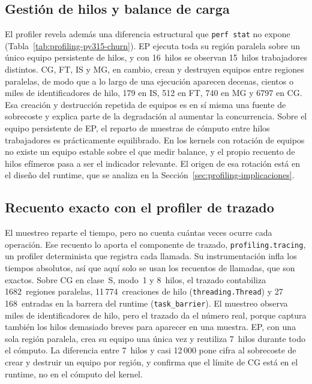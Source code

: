 

\subsection{Gestión de hilos y balance de carga}
El profiler revela además una diferencia estructural que \texttt{perf stat} no
expone (Tabla~\ref{tab:profiling-py315-churn}). EP ejecuta toda su región
paralela sobre un único equipo persistente de hilos, y con 16~hilos se observan
15~hilos trabajadores distintos. CG, FT, IS y MG, en cambio, crean y destruyen
equipos entre regiones paralelas, de modo que a lo largo de una ejecución
aparecen decenas, cientos o miles de identificadores de hilo, 179 en IS, 512 en
FT, 740 en MG y 6797 en CG. Esa creación y destrucción repetida de equipos es en
sí misma una fuente de sobrecoste y explica parte de la degradación al aumentar
la concurrencia. Sobre el equipo persistente de EP, el reparto de muestras de
cómputo entre hilos trabajadores es prácticamente equilibrado. En los kernels con
rotación de equipos no existe un equipo estable sobre el que medir balance, y el
propio recuento de hilos efímeros pasa a ser el indicador relevante. El origen de
esa rotación está en el diseño del runtime, que se analiza en la
Sección~\ref{sec:profiling-implicaciones}.



\newpage
\subsection{Recuento exacto con el profiler de trazado}
El muestreo reparte el tiempo, pero no cuenta cuántas veces ocurre cada
operación. Ese recuento lo aporta el componente de trazado,
\texttt{profiling.tracing}, un profiler determinista que registra cada llamada.
Su instrumentación infla los tiempos absolutos, así que aquí solo se usan los
recuentos de llamadas, que son exactos. Sobre CG en clase~S, modo~1 y 8~hilos, el
trazado contabiliza 1682~regiones paralelas, 11\,774~creaciones de hilo
(\texttt{threading.Thread}) y 27\,168~entradas en la barrera del runtime
(\texttt{task\_barrier}). El muestreo observa miles de identificadores de hilo,
pero el trazado da el número real, porque captura también los hilos demasiado
breves para aparecer en una muestra. EP, con una sola región paralela, crea su
equipo una única vez y reutiliza 7~hilos durante todo el cómputo. La diferencia
entre 7~hilos y casi 12\,000 pone
cifra al sobrecoste de crear y destruir un equipo por región, y confirma que el
límite de CG está en el runtime, no en el cómputo del kernel.

